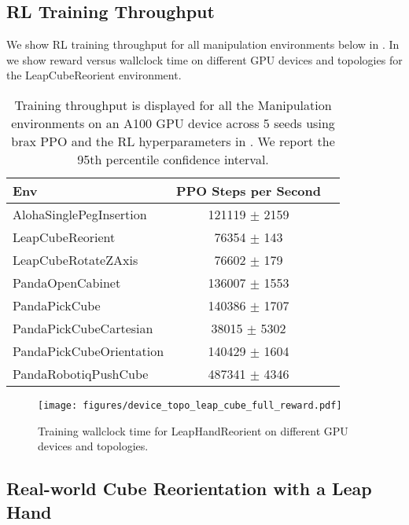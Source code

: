 \subsection{RL Training Throughput}
\label{sec:appendix_manipulation_throughput}

We show RL training throughput for all manipulation environments below in . In  we show reward versus wallclock time on different GPU devices and topologies for the LeapCubeReorient environment.

\begin{table*}[ht]
\centering
\begin{tabular}{|l|c|c|}
\hline 
 Env                   & PPO Steps per Second     \\
\hline 
 AlohaSinglePegInsertion  & 121119 $\pm$ 2159 \\
 LeapCubeReorient         & 76354 $\pm$ 143   \\
 LeapCubeRotateZAxis      & 76602 $\pm$ 179   \\
 PandaOpenCabinet         & 136007 $\pm$ 1553 \\
 PandaPickCube            & 140386 $\pm$ 1707 \\
 PandaPickCubeCartesian   & 38015 $\pm$ 5302  \\
 PandaPickCubeOrientation & 140429 $\pm$ 1604 \\
 PandaRobotiqPushCube     & 487341 $\pm$ 4346 \\
\hline 
\end{tabular}
\caption{Training throughput is displayed for all the Manipulation environments on an A100 GPU device across 5 seeds using brax PPO and the RL hyperparameters in . We report the 95th percentile confidence interval.}
\label{tab:manipulation_training_throughput}
\end{table*}


\begin{figure}[t]
    \centering
    \texttt{[image: figures/device\_topo\_leap\_cube\_full\_reward.pdf]}
    \caption{\small Training wallclock time for LeapHandReorient on different GPU devices and topologies.}
    \label{fig:leaphand_device_topo}
\end{figure}

\clearpage



\subsection{Real-world Cube Reorientation with a Leap Hand}
\label{sec:appendix_leaphand_real}

